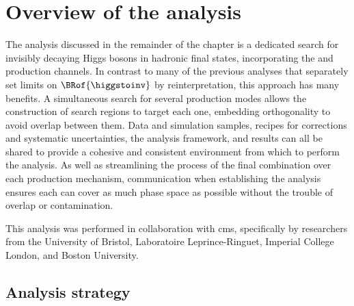 \section{Overview of the analysis}
\label{sec:htoinv_analysis_overview}

The analysis discussed in the remainder of the chapter is a dedicated search for invisibly decaying Higgs bosons in hadronic final states, incorporating the \ttH and \VH production channels. In contrast to many of the previous analyses that separately set limits on $\BRof{\higgstoinv}$ by reinterpretation, this approach has many benefits. A simultaneous search for several production modes allows the construction of search regions to target each one, embedding orthogonality to avoid overlap between them. Data and simulation samples, recipes for corrections and systematic uncertainties, the analysis framework, and results can all be shared to provide a cohesive and consistent environment from which to perform the analysis. As well as streamlining the process of the final combination over each production mechanism, communication when establishing the analysis ensures each can cover as much phase space as possible without the trouble of overlap or contamination.

This analysis was performed in collaboration with \acrshort{cms}, specifically by researchers from the University of Bristol, Laboratoire Leprince-Ringuet, Imperial College London, and Boston University.




\subsection{Analysis strategy}
\label{subsec:htoinv_analysis_strategy}

